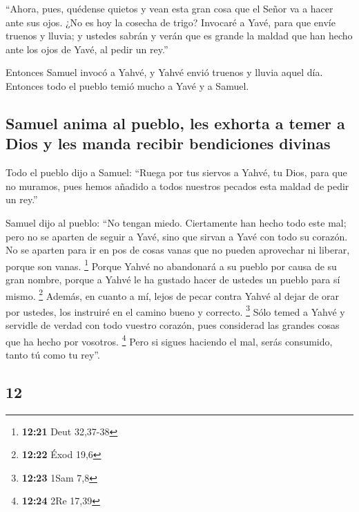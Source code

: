\begin{paracol}{2}
 ``Ahora, pues, quédense quietos y vean esta gran cosa
que el Señor va a hacer ante sus ojos.  ¿No es hoy la
cosecha de trigo? Invocaré a Yavé, para que envíe truenos y lluvia; y
ustedes sabrán y verán que es grande la maldad que han hecho ante los
ojos de Yavé, al pedir un rey.''

 Entonces Samuel invocó a Yahvé, y Yahvé envió truenos y
lluvia aquel día. Entonces todo el pueblo temió mucho a Yavé y a Samuel.

\hypertarget{samuel-anima-al-pueblo-les-exhorta-a-temer-a-dios-y-les-manda-recibir-bendiciones-divinas}{%
\subsection{Samuel anima al pueblo, les exhorta a temer a Dios y les
manda recibir bendiciones
divinas}\label{samuel-anima-al-pueblo-les-exhorta-a-temer-a-dios-y-les-manda-recibir-bendiciones-divinas}}

 Todo el pueblo dijo a Samuel: ``Ruega por tus siervos a
Yahvé, tu Dios, para que no muramos, pues hemos añadido a todos nuestros
pecados esta maldad de pedir un rey.''

 Samuel dijo al pueblo: ``No tengan miedo. Ciertamente
han hecho todo este mal; pero no se aparten de seguir a Yavé, sino que
sirvan a Yavé con todo su corazón.  No se aparten para ir
en pos de cosas vanas que no pueden aprovechar ni liberar, porque son
vanas. \footnote{\textbf{12:21} Deut 32,37-38}  Porque
Yahvé no abandonará a su pueblo por causa de su gran nombre, porque a
Yahvé le ha gustado hacer de ustedes un pueblo para sí mismo.
\footnote{\textbf{12:22} Éxod 19,6}  Además, en cuanto a
mí, lejos de pecar contra Yahvé al dejar de orar por ustedes, los
instruiré en el camino bueno y correcto. \footnote{\textbf{12:23} 1Sam
  7,8}  Sólo temed a Yahvé y servidle de verdad con todo
vuestro corazón, pues considerad las grandes cosas que ha hecho por
vosotros. \footnote{\textbf{12:24} 2Re 17,39}  Pero si
sigues haciendo el mal, serás consumido, tanto tú como tu rey''.

\switchcolumn
\begin{otherlanguage}{english}

\hypertarget{section-23}{%
\section{12}\label{section-23}}


\end{otherlanguage}
\end{paracol}
